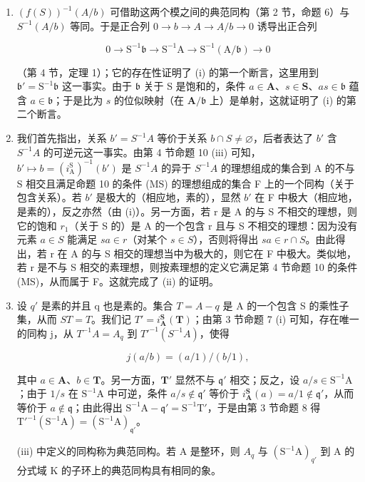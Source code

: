 \begin{enumerate}
\def\labelenumi{(\roman{enumi})}
\item
  \((f(S))^{-1}(A/b)\) 可借助这两个模之间的典范同构（第 2 节，命题 6）与 \(S^{-1}(A/b)\) 等同。于是正合列 \(0 \rightarrow b \rightarrow A \rightarrow A/b \rightarrow 0\) 诱导出正合列

\[
0 \rightarrow \mathrm{S} ^ {- 1} \mathfrak {b} \rightarrow \mathrm{S} ^ {- 1} \mathrm{A} \rightarrow \mathrm{S} ^ {- 1} (\mathrm{A} / \mathfrak {b}) \rightarrow 0
\]

（第 4 节，定理 1）；它的存在性证明了 (i) 的第一个断言，这里用到 \(\mathfrak{b}' = \mathrm{S}^{-1}\mathfrak{b}\) 这一事实。由于 \(\mathfrak{b}\) 关于 S 是饱和的，条件 \(a \in \mathbf{A}\)、\(s \in \mathbf{S}\)、\(as \in \mathfrak{b}\) 蕴含 \(a \in \mathfrak{b}\)；于是比为 \(s\) 的位似映射（在 \(\mathbf{A}/\mathfrak{b}\) 上）是单射，这就证明了 (i) 的第二个断言。

\item
  我们首先指出，关系 \(b' = S^{-1}A\) 等价于关系 \(b \cap S \neq \varnothing\)，后者表达了 \(b'\) 含 \(S^{-1}A\) 的可逆元这一事实。由第 4 节命题 10 (iii) 可知，\(b' \mapsto b = (i_{\mathrm{A}}^{\mathrm{S}})^{-1}(b')\) 是 \(S^{-1}A\) 的异于 \(S^{-1}A\) 的理想组成的集合到 A 的不与 S 相交且满足命题 10 的条件 (MS) 的理想组成的集合 F 上的一个同构（关于包含关系）。若 \(b'\) 是极大的（相应地，素的），显然 \(b'\) 在 F 中极大（相应地，是素的），反之亦然（由 (i)）。另一方面，若 r 是 A 的与 S 不相交的理想，则它的饱和 \(r_{1}\)（关于 S 的）是 A 的一个包含 r 且与 S 不相交的理想：因为没有元素 \(a \in S\) 能满足 \(sa \in r\)（对某个 \(s \in S\)），否则将得出 \(sa \in r \cap S\)。由此得出，若 r 在 A 的与 S 相交的理想当中为极大的，则它在 F 中极大。类似地，若 r 是不与 S 相交的素理想，则按素理想的定义它满足第 4 节命题 10 的条件 (MS)，从而属于 F。这就完成了 (ii) 的证明。
\item
  设 \(q'\) 是素的并且 q 也是素的。集合 \(T = A - q\) 是 A 的一个包含 S 的乘性子集，从而 \(ST = T\)。我们记 \(T' = i_{\mathbf{A}}^{\mathbf{S}}(\mathbf{T})\)；由第 3 节命题 7 (i) 可知，存在唯一的同构 j，从 \(T^{-1}A = A_{q}\) 到 \(T'^{-1}(S^{-1}A)\)，使得

\[
j (a / b) = (a / 1) / (b / 1),
\]

其中 \(a \in \mathbf{A}\)、\(b \in \mathbf{T}\)。另一方面，\(\mathbf{T}'\) 显然不与 \(\mathfrak{q}'\) 相交；反之，设 \(a / s \in \mathrm{S}^{-1}\mathrm{A}\)；由于 \(1 / s\) 在 \(\mathrm{S}^{-1}\mathrm{A}\) 中可逆，条件 \(a / s \notin \mathfrak{q}'\) 等价于 \(i_{\mathbf{A}}^{\mathbf{S}}(a) = a / 1 \notin \mathfrak{q}'\)，从而等价于 \(a \notin \mathfrak{q}\)；由此得出 \(\mathrm{S}^{-1}\mathrm{A} - \mathfrak{q}' = \mathrm{S}^{-1}\mathrm{T}'\)，于是由第 3 节命题 8 得 \(\mathrm{T}'^{-1}(\mathrm{S}^{-1}\mathrm{A}) = (\mathrm{S}^{-1}\mathrm{A})_{\mathfrak{q}'}\)。

(iii) 中定义的同构称为典范同构。若 A 是整环，则 \(A_{q}\) 与 \((\mathrm{S}^{-1}\mathrm{A})_{q'}\) 到 A 的分式域 K 的子环上的典范同构具有相同的象。
\end{enumerate}

